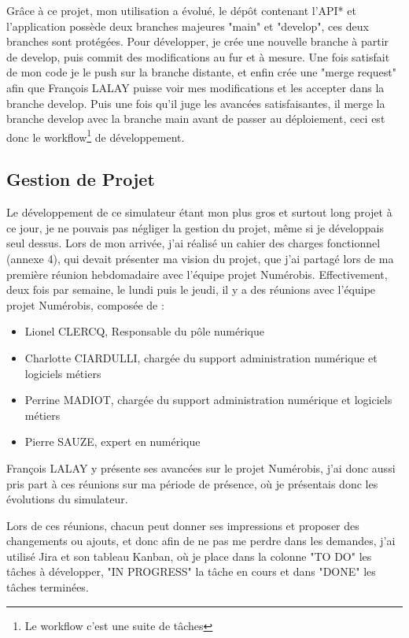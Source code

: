 \documentclass[a4paper,12pt]{report}
\begin{document}
Grâce à ce projet, mon utilisation a évolué, le dépôt contenant l'API* et l'application possède deux branches majeures "main" et "develop", ces deux branches sont protégées. Pour développer, je crée une nouvelle branche à partir de develop, puis commit des modifications au fur et à mesure. Une fois satisfait de mon code je le push sur la branche distante, et enfin crée une "merge request" afin que François LALAY puisse voir mes modifications et les accepter dans la branche develop. Puis une fois qu'il juge les avancées satisfaisantes, il merge la branche develop avec la branche main avant de passer au déploiement, ceci est donc le workflow\footnote{Le workflow c'est une suite de tâches} de développement.

\subsection{Gestion de Projet}
Le développement de ce simulateur étant mon plus gros et surtout long projet à ce jour, je ne pouvais pas négliger la gestion du projet, même si je développais seul dessus. Lors de mon arrivée, j'ai réalisé un cahier des charges fonctionnel (annexe 4), qui devait présenter ma vision du projet, que j'ai partagé lors de ma première réunion hebdomadaire avec l'équipe projet Numérobis. Effectivement, deux fois par semaine, le lundi puis le jeudi, il y a des réunions avec l'équipe projet Numérobis, composée de :
\begin{itemize}
    \item Lionel CLERCQ, Responsable du pôle numérique
    \item Charlotte CIARDULLI, chargée du support administration numérique et logiciels métiers
    \item Perrine MADIOT, chargée du support administration numérique et logiciels métiers
    \item Pierre SAUZE, expert en numérique
\end{itemize}
François LALAY y présente ses avancées sur le projet Numérobis, j'ai donc aussi pris part à ces réunions sur ma période de présence, où je présentais donc les évolutions du simulateur. 


Lors de ces réunions, chacun peut donner ses impressions et proposer des changements ou ajouts, et donc afin de ne pas me perdre dans les demandes, j'ai utilisé Jira et son tableau Kanban, où je place dans la colonne "TO DO" les tâches à développer, "IN PROGRESS" la tâche en cours et dans "DONE" les tâches terminées.
\end{document}
